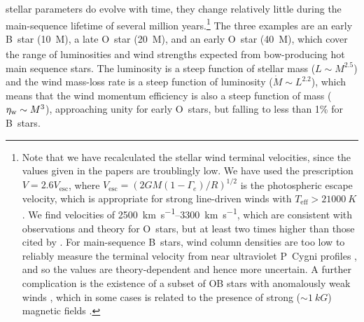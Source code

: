 stellar parameters do evolve with time, they change relatively little
during the main-sequence lifetime of several million years.\footnote{%
  \label{fn:meyer-velocities-too-low}
  Note that we have recalculated the stellar wind terminal velocities,
  since the values given in the \citeauthor{Meyer:2014b} papers are
  troublingly low.  We have used the prescription
  \(V = 2.6 V_{\text{esc}}\), where
  \(V_{\text{esc}} = \left( 2 G M (1 - \Gamma_e)/ R \right)^{1/2}\) is the
  photospheric escape velocity, which is appropriate for strong
  line-driven winds with \(T_{\text{eff}} > \SI{21 000}{K}\)
  \citep{Lamers:1995a}.  We find velocities of
  \SIrange{2500}{3300}{km.s^{-1}}, which are consistent with
  observations and theory \citep{Vink:1999a} for O~stars, but at least
  two times higher than those cited by \citet{Meyer:2014b}. For
  main-sequence B~stars, wind column densities are too low to reliably
  measure the terminal velocity from near ultraviolet P~Cygni profiles
  \citep{Prinja:1989a}, and so the values are theory-dependent
  \citep{Krticka:2014a} and hence more uncertain.  A further
  complication is the existence of a subset of OB stars with
  anomalously weak winds \citep{Puls:2008a}, which in some cases is
  related to the presence of strong (\(\sim \SI{1}{kG}\)) magnetic fields
  \citep{Oskinova:2011b}.} %
The three examples are an early B~star (\SI{10}{M_\odot}), a late O~star
(\SI{20}{M_\odot}), and an early O~star (\SI{40}{M_\odot}), which cover the
range of luminosities and wind strengths expected from bow-producing
hot main sequence stars.  The luminosity is a steep function of
stellar mass (\(L \sim M^{2.5}\)) and the wind mass-loss rate is a steep
function of luminosity (\(\dot{M} \sim L^{2.2}\)), which means that the
wind momentum efficiency is also a steep function of mass
(\(\eta_{\text{w}} \sim M^3\)), approaching unity for early O~stars, but falling to
less than 1\% for B~stars.

